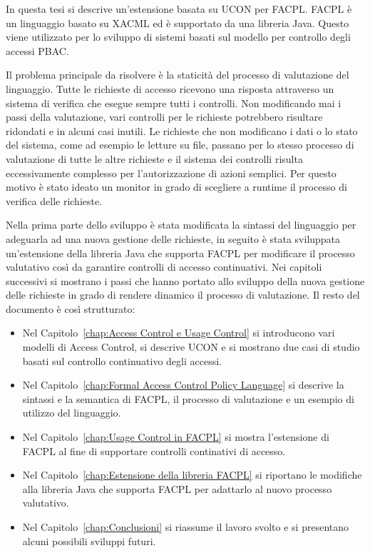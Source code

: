 In questa tesi si descrive un'estensione basata su UCON per \ac{FACPL}.
\ac{FACPL} è un linguaggio basato su \ac{XACML} ed è supportato da una libreria Java. Questo viene utilizzato per lo
sviluppo di sistemi basati sul modello per controllo degli accessi \acl{PBAC}.\par
Il problema principale da risolvere è la staticità del processo di valutazione del linguaggio.
Tutte le richieste di accesso ricevono una risposta attraverso un sistema di verifica che esegue sempre
tutti i controlli. Non modificando mai i passi della valutazione, vari controlli per le richieste potrebbero
risultare ridondati e in alcuni casi inutili. Le richieste che non modificano i dati
o lo stato del sistema, come ad esempio le letture su file, passano per lo stesso processo di valutazione
di tutte le altre richieste e il sistema dei controlli risulta eccessivamente complesso per l'autorizzazione di azioni semplici.
Per questo motivo è stato ideato un monitor in grado di scegliere a runtime il processo di verifica delle richieste.\par
Nella prima parte dello sviluppo è stata modificata la sintassi del linguaggio per adeguarla ad una nuova
gestione delle richieste, in seguito
è stata sviluppata un'estensione della libreria Java che supporta \ac{FACPL} per modificare
il processo valutativo così da garantire controlli di accesso continuativi.
Nei capitoli successivi si mostrano i passi che hanno portato allo sviluppo della nuova gestione delle richieste
in grado di rendere dinamico il processo di valutazione.
\vspace{5mm}
\newline
Il resto del documento è così strutturato:
\begin{itemize}
  \renewcommand\labelitemi{--}
  \item Nel Capitolo~\ref{chap:Access Control e Usage Control}
  si introducono vari modelli di Access Control, si descrive \ac{UCON} e si mostrano due casi di studio basati sul
  controllo continuativo degli accessi.
  \item Nel Capitolo~\ref{chap:Formal Access Control Policy Language}
  si descrive la sintassi e la semantica di \ac{FACPL}, il processo di valutazione e un esempio di utilizzo del linguaggio.
  \item Nel Capitolo~\ref{chap:Usage Control in FACPL}
  si mostra l'estensione di \ac{FACPL} al fine di supportare controlli continativi di accesso.
  \item Nel Capitolo~\ref{chap:Estensione della libreria FACPL}
  si riportano le modifiche alla libreria Java che supporta \ac{FACPL} per adattarlo al nuovo processo valutativo.
  \item Nel Capitolo~\ref{chap:Conclusioni}
  si riassume il lavoro svolto e si presentano alcuni possibili sviluppi futuri.
\end{itemize}
